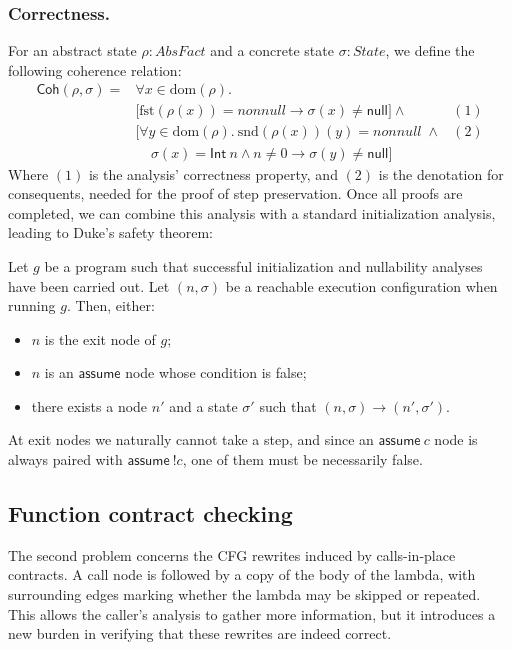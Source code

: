 \documentclass[runningheads]{llncs}
\newcommand{\coh}{\mathsf{Coh}}
\newcommand{\AbsFact}{\mathit{AbsFact}}
\newcommand{\nonnull}{\mathit{nonnull}}
\newcommand{\knull}{\mathsf{null}}
\newcommand{\kInt}{\mathsf{Int}}
\newcommand{\kassume}{\mathsf{assume}}
\newcommand{\fst}{\mathrm{fst}}
\newcommand{\snd}{\mathrm{snd}}
\newcommand{\dom}{\mathrm{dom}}
\begin{document}
\subsubsection{Correctness.}
For an abstract state $\rho : \AbsFact$ and a concrete state $\sigma : \mathit{State}$, we define the following coherence relation:
\begin{align*}
  \coh(\rho, \sigma) = {} & \forall x \in \dom(\rho). & \\
  & \bigl[\fst(\rho(x)) = \nonnull \to \sigma(x) \neq \knull\bigr] \wedge {} & (1)\\
  & \bigl[\forall y \in \dom(\rho).\ \snd(\rho(x))(y) = \nonnull \; \wedge & (2)\\
  & \; \; \; \; \sigma(x) = \kInt\ n \wedge n \neq 0 \to \sigma(y) \neq \knull\bigr] &
\end{align*}
Where $(1)$ is the analysis' correctness property, and $(2)$ is the denotation for consequents, needed for the proof of step preservation. Once all proofs are completed, we can combine this analysis with a standard initialization analysis, leading to Duke's safety theorem:

\begin{theorem}
Let $g$ be a program such that successful initialization and nullability analyses have been carried out. Let $(n, \sigma)$ be a reachable execution configuration when running $g$. Then, either:
\begin{itemize}
  \item $n$ is the exit node of $g$;
  \item $n$ is an $\kassume$ node whose condition is false;
  \item there exists a node $n'$ and a state $\sigma'$ such that $(n, \sigma) \to (n', \sigma')$.
\end{itemize}
\end{theorem}

At exit nodes we naturally cannot take a step, and since an $\kassume\ c$ node is always paired with $\kassume\ {!}c$, one of them must be necessarily false.

\subsection{Function contract checking}

The second problem concerns the CFG rewrites induced by calls-in-place contracts. A call node is followed by a copy of the body of the lambda, with surrounding edges marking whether the lambda may be skipped or repeated. This allows the caller's analysis to gather more information, but it introduces a new burden in verifying that these rewrites are indeed correct.
\end{document}
